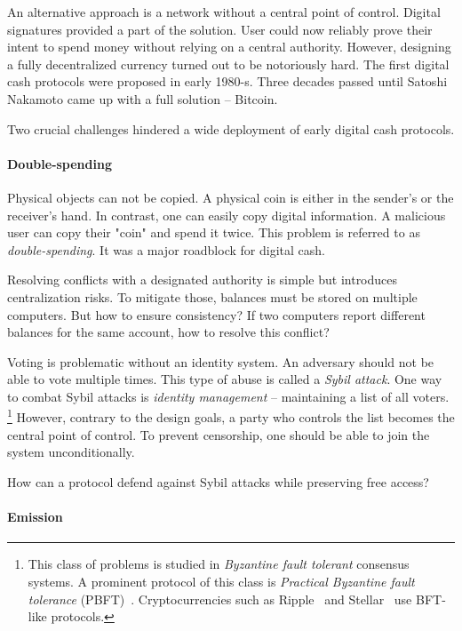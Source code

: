 An alternative approach is a network without a central point of control.
Digital signatures provided a part of the solution.
User could now reliably prove their intent to spend money without relying on a central authority.
However, designing a fully decentralized currency turned out to be notoriously hard.
The first digital cash protocols were proposed in early 1980-s.
Three decades passed until Satoshi Nakamoto came up with a full solution -- Bitcoin.

Two crucial challenges hindered a wide deployment of early digital cash protocols.

\paragraph{Double-spending}

Physical objects can not be copied.
A physical coin is either in the sender's or the receiver's hand.
In contrast, one can easily copy digital information.
A malicious user can copy their "coin" and spend it twice.
This problem is referred to as \textit{double-spending}.
It was a major roadblock for digital cash.

Resolving conflicts with a designated authority is simple but introduces centralization risks.
To mitigate those, balances must be stored on multiple computers.
But how to ensure consistency?
If two computers report different balances for the same account, how to resolve this conflict?

Voting is problematic without an identity system.
An adversary should not be able to vote multiple times.
This type of abuse is called a \textit{Sybil attack}.
One way to combat Sybil attacks is \textit{identity management} -- maintaining a list of all voters.
\footnote{This class of problems is studied in \textit{Byzantine fault tolerant} consensus systems.
A prominent protocol of this class is \textit{Practical Byzantine fault tolerance} (PBFT)~\cite{Castro2002}.
Cryptocurrencies such as Ripple~\cite{Schwartz2014} and Stellar~\cite{Mazieres2014} use BFT-like protocols.}
However, contrary to the design goals, a party who controls the list becomes the central point of control.
To prevent censorship, one should be able to join the system unconditionally.

How can a protocol defend against Sybil attacks while preserving free access?


\paragraph{Emission}

